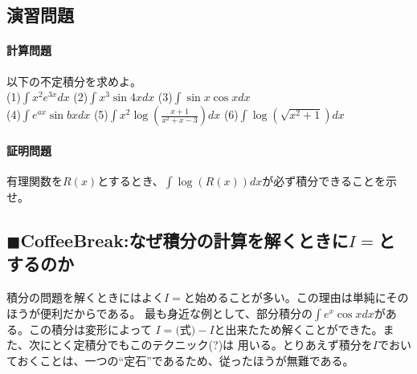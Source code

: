 \documentclass[a4j,dvipdfmx]{jsarticle}
\begin{document}
\subsection{演習問題}
\paragraph{計算問題}
以下の不定積分を求めよ。\\

(1)$\displaystyle \int x^2e^{3x}dx$
\hspace{20mm}
(2)$\displaystyle \int x^3\sin 4xdx$
\hspace{20mm}
(3)$\displaystyle \int \sin x\cos xdx$\\

(4)$\displaystyle \int e^{ax}\sin bxdx$
\hspace{15mm}
(5)$\displaystyle \int x^2\log\left(\frac{x+1}{x^2+x-3}\right)dx$
\hspace{0.5mm}
(6)$\displaystyle \int \log(\sqrt{x^2+1})dx$
\\
\paragraph{証明問題}
有理関数を$R(x)$とするとき、$\displaystyle \int \log(R(x))dx$が必ず積分できることを示せ。

\subsection{$\blacksquare$CoffeeBreak:なぜ積分の計算を解くときに$I=$とするのか}
\begin{screen}
    積分の問題を解くときにはよく$I=$と始めることが多い。この理由は単純にそのほうが便利だからである。
    最も身近な例として、部分積分の$\displaystyle\int e^x\cos xdx$がある。この積分は変形によって
    $I=\text{(式)}-I$と出来たため解くことができた。また、次にとく定積分でもこのテクニック(?)は
    用いる。とりあえず積分を$I$でおいておくことは、一つの``定石''であるため、従ったほうが無難である。
\end{screen}
\end{document}
